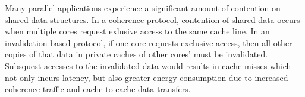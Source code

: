 




Many parallel applications experience a significant amount of contention on shared data structures. In a coherence protocol, contention of shared data occurs when multiple cores request exlusive access to the same cache line. In an invalidation based protocol, if one core requests exclusive access, then all other copies of that data in private caches of other cores' must be invalidated. Subsquest accesses to the invalidated data would results in cache misses which not only incurs latency, but also greater energy consumption due to increased coherence traffic and cache-to-cache data transfers.

